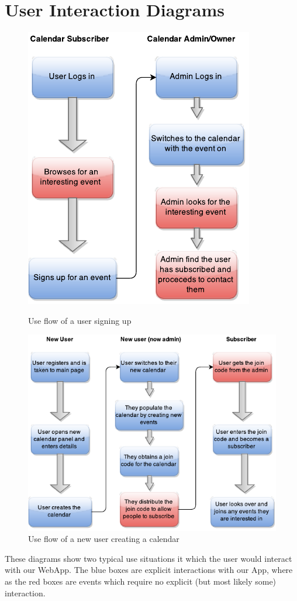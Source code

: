 \documentclass[10pt,a4paper]{article}
\begin{document}
\section{User Interaction Diagrams}
\label{sec:fd}
\begin{figure}[H]
\centering
\begin{minipage}{.4\textwidth}
  \centering
  \includegraphics[width=1\linewidth]{user_event}
  \caption{Use flow of a user signing up}
\end{minipage}%
\begin{minipage}{.7\textwidth}
  \centering
  \includegraphics[width=0.9\linewidth]{calendar_user}
  \caption{Use flow of a new user creating a calendar}
\end{minipage}
\end{figure}
\noindent These diagrams show two typical use situations it which the user would interact with our WebApp. The blue boxes are explicit interactions with our App, where as the red boxes are events which require no explicit (but most likely some) interaction.
\end{document}
